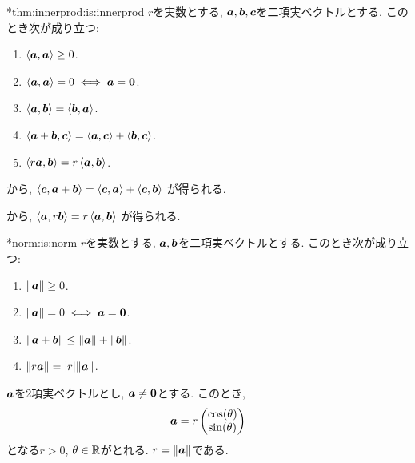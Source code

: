 \begin{prop}
  \provelater**{thm:innerprod:is:innerprod}
  \label{thm:innerprod:is:innerprod}
  $r$を実数とする, $\boldsymbol{a},\boldsymbol{b},\boldsymbol{c}$を二項実ベクトルとする.
  このとき次が成り立つ:
  \begin{enumerate}
  \item{}
    $\Braket{\boldsymbol{a},\boldsymbol{a}}\geq 0$.
  \item{}
    $\Braket{\boldsymbol{a},\boldsymbol{a}}=0\iff \boldsymbol{a}=\boldsymbol{0}$.
  \item{}
    \label{item:inner:c}
    $\Braket{\boldsymbol{a},\boldsymbol{b}}=\Braket{\boldsymbol{b},\boldsymbol{a}}$.
  \item{}
    \label{item:inner:a}
    $\Braket{\boldsymbol{a}+\boldsymbol{b},\boldsymbol{c}}=\Braket{\boldsymbol{a},\boldsymbol{c}}+\Braket{\boldsymbol{b},\boldsymbol{c}}$.
  \item{}
    \label{item:inner:m}
    $\Braket{r\boldsymbol{a},\boldsymbol{b}}=r\Braket{\boldsymbol{a},\boldsymbol{b}}$.
  \end{enumerate}
\end{prop}
\begin{remark}
  から,
    $\Braket{\boldsymbol{c},\boldsymbol{a}+\boldsymbol{b}}=\Braket{\boldsymbol{c},\boldsymbol{a}}+\Braket{\boldsymbol{c},\boldsymbol{b}}$
    が得られる.

    から,
    $\Braket{\boldsymbol{a},r\boldsymbol{b}}=r\Braket{\boldsymbol{a},\boldsymbol{b}}$
    が得られる.
\end{remark}
\begin{prop}
  \provelater**{norm:is:norm}
  $r$を実数とする, $\boldsymbol{a},\boldsymbol{b}$を二項実ベクトルとする.
  このとき次が成り立つ:
  \begin{enumerate}
  \item{}
    $\|\boldsymbol{a}\|\geq 0$.
  \item{}
    $\|\boldsymbol{a}\|=0\iff \boldsymbol{a}=\boldsymbol{0}$.
  \item{}
    $\|\boldsymbol{a}+\boldsymbol{b}\|\leq \|\boldsymbol{a}\|+\|\boldsymbol{b}\|$.
  \item{}
    $\|r\boldsymbol{a}\|=|r| \|\boldsymbol{a}\|$.
  \end{enumerate}
\end{prop}


$\boldsymbol{a}$を2項実ベクトルとし,
$\boldsymbol{a}\neq \boldsymbol{0}$とする.
このとき,
\begin{align*}
  \boldsymbol{a} = r \begin{pmatrix}\cos(\theta)\\\sin(\theta)\end{pmatrix}
\end{align*}
となる$r>0$, $\theta\in\mathbb{R}$がとれる.
$r=\|\boldsymbol{a}\|$である.

